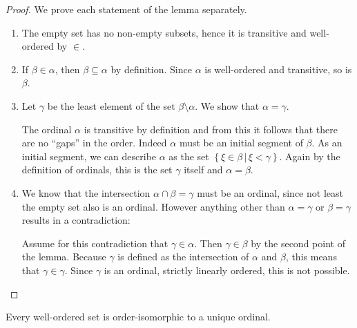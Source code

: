 \documentclass[../../main.tex]{subfiles}
\begin{document}
\begin{proof}
    We prove each statement of the lemma separately.
    \begin{enumerate}
        \item The empty set has no non-empty subsets, hence it is transitive and well-ordered by $\in$.
        \item If $\beta \in \alpha$, then $\beta \subseteq \alpha$ by definition. Since $\alpha$ is well-ordered and transitive, so is $\beta$.
        \item Let $\gamma$ be the least element of the set $\beta \setminus \alpha$. We show that $\alpha = \gamma$.
        
        The ordinal $\alpha$ is transitive by definition and from this it follows that there are no ``gaps'' in the order. Indeed $\alpha$ must be an initial segment of $\beta$.
        As an initial segment, we can describe $\alpha$ as the set $\left\{\xi \in \beta \,\vert\, \xi < \gamma\right\}$.
        Again by the definition of ordinals, this is the set $\gamma$ itself and $\alpha = \beta$.
        \item We know that the intersection $\alpha \cap \beta = \gamma$ must be an ordinal, since not least the empty set also is an ordinal.
        However anything other than $\alpha = \gamma$ or $\beta = \gamma$ results in a contradiction:
        
        Assume for this contradiction that $\gamma \in \alpha$. Then $\gamma \in \beta$ by the second point of the lemma. 
        Because $\gamma$ is defined as the intersection of $\alpha$ and $\beta$, this means that $\gamma \in \gamma$.
        Since $\gamma$ is an ordinal, strictly linearly ordered, this is not possible. \qedhere
    \end{enumerate}
\end{proof}

\begin{theorem}\label{unique-ordinal}\cite[Theorem 2, p.15]{Jec78}
    Every well-ordered set is order-isomorphic to a unique ordinal.
\end{theorem}
\end{document}
